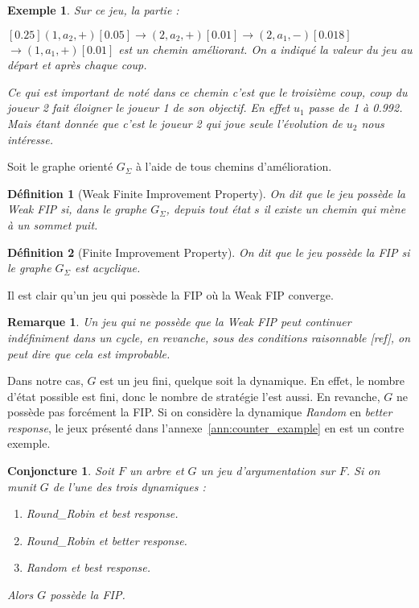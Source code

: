 \documentclass[11pt]{article}
\newtheorem{conjoncture}{Conjoncture}[section]
\theoremstyle{defi}
\newtheorem{definition}{Définition}[section]
\theoremstyle{not}
\theoremstyle{prob}
\newtheorem{example}{Exemple}[section]
\newtheorem{remarque}{Remarque}[section]
\begin{document}
\begin{example}
        Sur ce jeu, la partie :

        \scriptsize$[0.25]$\normalsize$(1, a_2, +)$\scriptsize$[0.05]$\normalsize$ \rightarrow (2, a_2, +)$\scriptsize$[0.01]$\normalsize$ \rightarrow (2, a_1, -)$\scriptsize$[0.018]$\normalsize$ \rightarrow (1, a_1, +)$\scriptsize$[0.01]$ \normalsize est un chemin améliorant.
        On a indiqué la valeur du jeu au départ et après chaque coup.

        Ce qui est important de noté dans ce chemin c'est que le troisième coup, coup du joueur 2 fait éloigner le joueur 1 de son objectif. En effet $u_1$ passe de 1 à 0.992. Mais étant donnée que c'est le joueur 2 qui joue seule l'évolution de $u_2$ nous intéresse.

      \end{example}

      Soit le graphe orienté $G_\Sigma$ à l'aide de tous chemins d'amélioration.

      \begin{definition}[Weak Finite Improvement Property]
        On dit que le jeu possède la Weak FIP si, dans le graphe $G_\Sigma$, depuis tout état $s$ il existe un chemin qui mène à un sommet puit.
      \end{definition}

      \begin{definition}[Finite Improvement Property]
        On dit que le jeu possède la FIP si le graphe $G_\Sigma$ est acyclique.
      \end{definition}

      Il est clair qu'un jeu qui possède la FIP où la Weak FIP converge.

      \begin{remarque}
        Un jeu qui ne possède que la Weak FIP peut continuer indéfiniment dans un cycle, en revanche, sous des conditions raisonnable [ref], on peut dire que cela est improbable.
      \end{remarque}

      Dans notre cas, $G$ est un jeu fini, quelque soit la dynamique. En effet, le nombre d'état possible est fini, donc le nombre de stratégie l'est aussi.
      En revanche, $G$ ne possède pas forcément la FIP. Si on considère la dynamique \emph{Random} en \emph{better response}, le jeux présenté dans l'annexe~\ref{ann:counter_example} en est un contre exemple.

      \begin{conjoncture}
        Soit $F$ un arbre et $G$ un jeu d'argumentation sur $F$. Si on munit $G$ de l'une des trois dynamiques :
        \begin{enumerate}
          \item \emph{Round\_Robin} et \emph{best response}.
          \item \emph{Round\_Robin} et \emph{better response}.
          \item \emph{Random} et \emph{best response}.
        \end{enumerate}
        Alors $G$ possède la FIP.
      \end{conjoncture}
\end{document}
